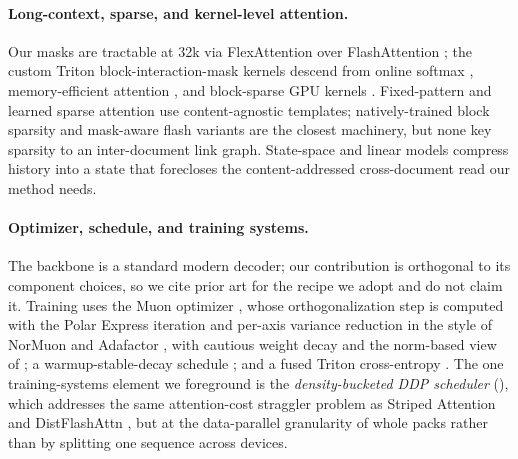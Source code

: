 \paragraph{Long-context, sparse, and kernel-level attention.}
Our masks are tractable at 32k via FlexAttention
\citep{flexattention_blog2024,flexattention_paper2024} over FlashAttention
\citep{dao2022flashattention,dao2023flashattention2,shah2024flashattention3}; the custom
Triton \citep{tillet2019triton} block-interaction-mask kernels descend from online
softmax \citep{milakov2018onlinesoftmax}, memory-efficient attention
\citep{rabe2021selfattention}, and block-sparse GPU kernels \citep{gray2017blocksparse}.
Fixed-pattern \citep{child2019sparsetransformers,beltagy2020longformer,zaheer2020bigbird}
and learned \citep{kitaev2020reformer,roy2021routing} sparse attention use
content-agnostic templates; natively-trained block sparsity
\citep{yuan2025nativesparse,lu2025moba} and mask-aware flash variants
\citep{pagliardini2023sparseflash,wang2024flashmask} are the closest machinery, but none
key sparsity to an inter-document link graph. State-space and linear models
\citep{gu2023mamba,peng2023rwkv} compress history into a state that forecloses the
content-addressed cross-document read our method needs.

\paragraph{Optimizer, schedule, and training systems.}
The backbone is a standard modern decoder; our contribution is orthogonal to its
component choices, so we cite prior art for the recipe we adopt and do not claim it.
Training uses the Muon optimizer \citep{jordan2024muon,liu2025muonscalable}, whose
orthogonalization step is computed with the Polar Express iteration
\citep{amsel2025polarexpress} and per-axis variance reduction in the style of NorMuon
\citep{li2025normuon} and Adafactor \citep{shazeer2018adafactor}, with cautious weight
decay \citep{liang2024cautious,chen2025cautiouswd} and the norm-based view of
\citet{bernstein2024oldoptimizer}; a warmup-stable-decay schedule
\citep{hu2024minicpm,hagele2024wsd}; and a fused Triton cross-entropy
\citep{hsu2024liger}. The one training-systems element we foreground is the
\emph{density-bucketed DDP scheduler} (), which addresses the same
attention-cost straggler problem as Striped Attention \citep{brandon2023striped} and
DistFlashAttn \citep{li2023distflashattn}, but at the data-parallel granularity of whole
packs rather than by splitting one sequence across devices.

